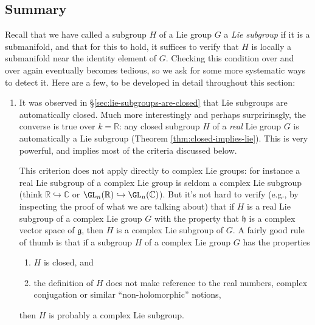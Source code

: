 \documentclass[reqno]{amsart} 
\begin{document}
\subsection{Summary}
\label{sec:org1d479ae}
Recall that we have called a subgroup $H$ of a Lie group $G$ a \emph{Lie subgroup} if it is a submanifold, and that for this to hold, it suffices to verify that $H$ is locally a submanifold near the identity element of $G$.  Checking this condition over and over again eventually becomes tedious, so we ask for some more systematic ways to detect it.  Here are a few, to be developed in detail throughout this section:
\begin{enumerate}
\item It was observed in \S\ref{sec:lie-subgroups-are-closed} that Lie subgroups are automatically closed.  Much more interestingly and perhaps surpririnsgly, the converse is true over $k = \mathbb{R}$: any closed subgroup $H$ of a \emph{real} Lie group $G$ is automatically a Lie subgroup (Theorem \ref{thm:closed-implies-lie}).  This is very powerful, and implies most of the criteria discussed below.

  This criterion does not apply directly to complex Lie groups: for instance a real Lie subgroup of a complex Lie group is seldom a complex Lie subgroup (think $\mathbb{R} \hookrightarrow \mathbb{C}$ or $\GL_n(\mathbb{R}) \hookrightarrow \GL_n(\mathbb{C})$).  But it's not hard to verify (e.g., by inspecting the proof of what we are talking about) that if $H$ is a real Lie subgroup of a complex Lie group $G$ with the property that $\mathfrak{h}$ is a complex vector space of $\mathfrak{g}$, then $H$ is a complex Lie subgroup of $G$.  A fairly good rule of thumb is that if a subgroup $H$ of a complex Lie group $G$ has the properties
  \begin{enumerate}
  \item $H$ is closed, and
  \item the definition of $H$ does not make reference to the real numbers, complex conjugation or similar ``non-holomorphic'' notions,
  \end{enumerate}
  then $H$ is probably a complex Lie subgroup.


\end{enumerate}
\end{document}
